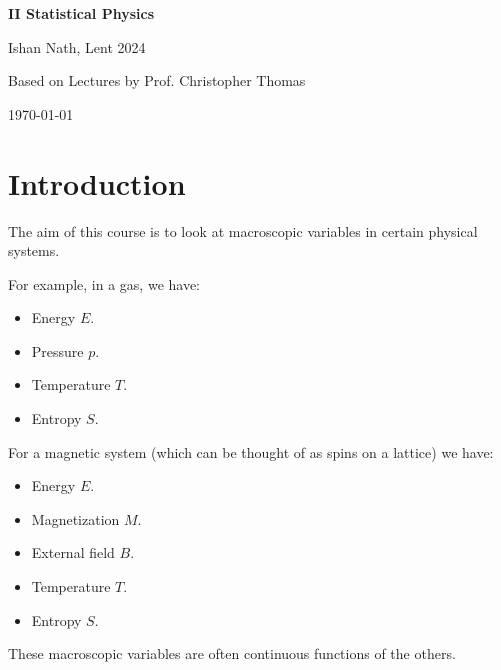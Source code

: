 \documentclass[12pt]{article}
\begin{document}
\hypersetup{pageanchor=false}
\begin{titlepage}
	\begin{center}
		\vspace*{1em}
		\Huge
		\textbf{II Statistical Physics}

		\vspace{1em}
		\large
		Ishan Nath, Lent 2024

		\vspace{1.5em}

		\Large

		Based on Lectures by Prof. Christopher Thomas

		\vspace{1em}

		\large
		\today
	\end{center}
	
\end{titlepage}
\hypersetup{pageanchor=true}

\tableofcontents

\newpage

\section{Introduction}
\label{sec:intro}

The aim of this course is to look at macroscopic variables in certain physical systems.

For example, in a gas, we have:
\begin{itemize}
	\item Energy $E$.
	\item Pressure $p$.
	\item Temperature $T$.
	\item Entropy $S$.
\end{itemize}

For a magnetic system (which can be thought of as spins on a lattice) we have:
\begin{itemize}
	\item Energy $E$.
	\item Magnetization $M$.
	\item External field $B$.
	\item Temperature $T$.
	\item Entropy $S$.
\end{itemize}

These macroscopic variables are often continuous functions of the others.

\newpage
\end{document}
